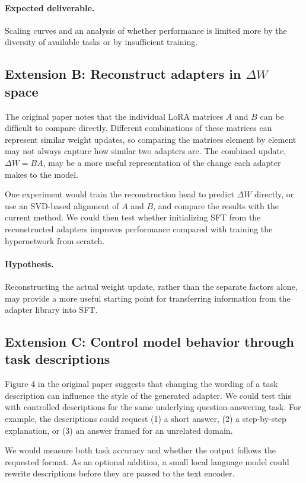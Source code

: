 \documentclass{article}
\begin{document}
\paragraph{Expected deliverable.}
Scaling curves and an analysis of whether performance is limited more by the diversity of available tasks or by insufficient training.

\subsection{Extension B: Reconstruct adapters in $\Delta W$ space}

The original paper notes that the individual LoRA matrices $A$ and $B$ can be difficult to compare directly. Different combinations of these matrices can represent similar weight updates, so comparing the matrices element by element may not always capture how similar two adapters are. The combined update, $\Delta W=BA$, may be a more useful representation of the change each adapter makes to the model.

One experiment would train the reconstruction head to predict $\Delta W$ directly, or use an SVD-based alignment of $A$ and $B$, and compare the results with the current method. We could then test whether initializing SFT from the reconstructed adapters improves performance compared with training the hypernetwork from scratch.

\paragraph{Hypothesis.}
Reconstructing the actual weight update, rather than the separate factors alone, may provide a more useful starting point for transferring information from the adapter library into SFT.

\subsection{Extension C: Control model behavior through task descriptions}

Figure 4 in the original paper suggests that changing the wording of a task description can influence the style of the generated adapter. We could test this with controlled descriptions for the same underlying question-answering task. For example, the descriptions could request (1) a short answer, (2) a step-by-step explanation, or (3) an answer framed for an unrelated domain.

We would measure both task accuracy and whether the output follows the requested format. As an optional addition, a small local language model could rewrite descriptions before they are passed to the text encoder.
\end{document}
